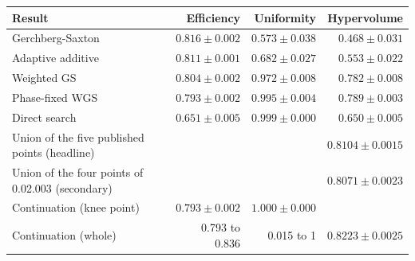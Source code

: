 \begin{tabular}{@{}lrrr@{}}
\toprule
Result & Efficiency & Uniformity & Hypervolume \\
\midrule
Gerchberg-Saxton & $0.816\pm0.002$ & $0.573\pm0.038$ & $0.468\pm0.031$ \\
Adaptive additive & $0.811\pm0.001$ & $0.682\pm0.027$ & $0.553\pm0.022$ \\
Weighted GS & $0.804\pm0.002$ & $0.972\pm0.008$ & $0.782\pm0.008$ \\
Phase-fixed WGS & $0.793\pm0.002$ & $0.995\pm0.004$ & $0.789\pm0.003$ \\
Direct search & $0.651\pm0.005$ & $0.999\pm0.000$ & $0.650\pm0.005$ \\
\midrule
Union of the five published points (headline) &  &  & $0.8104\pm0.0015$ \\
Union of the four points of 0.02.003 (secondary) &  &  & $0.8071\pm0.0023$ \\
Continuation (knee point) & $0.793\pm0.002$ & $1.000\pm0.000$ &  \\
Continuation (whole) & 0.793 to 0.836 & 0.015 to 1 & $0.8223\pm0.0025$ \\
\bottomrule
\end{tabular}
